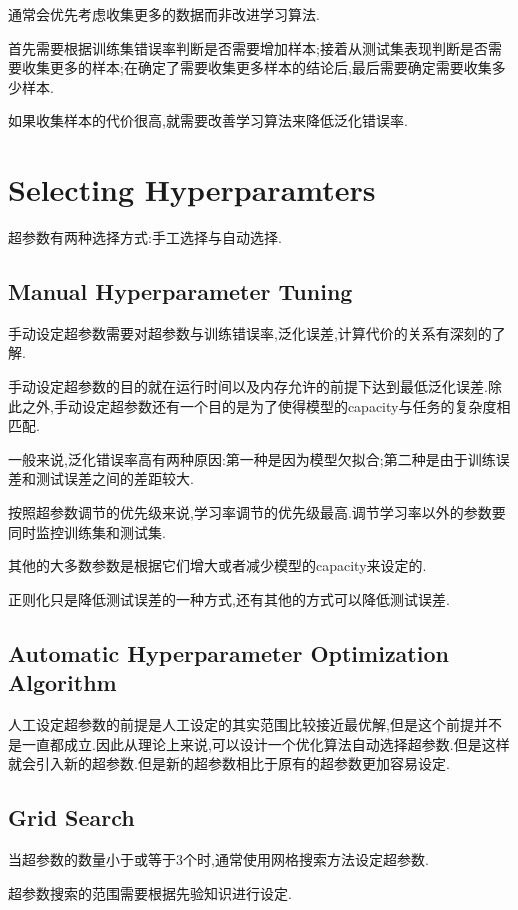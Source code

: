 通常会优先考虑收集更多的数据而非改进学习算法.

首先需要根据训练集错误率判断是否需要增加样本;接着从测试集表现判断是否需要收集更多的样本;在确定了需要收集更多样本的结论后,最后需要确定需要收集多少样本.

如果收集样本的代价很高,就需要改善学习算法来降低泛化错误率.

\section{Selecting Hyperparamters}

超参数有两种选择方式:手工选择与自动选择.

\subsection{Manual Hyperparameter Tuning}

手动设定超参数需要对超参数与训练错误率,泛化误差,计算代价的关系有深刻的了解.

手动设定超参数的目的就在运行时间以及内存允许的前提下达到最低泛化误差.除此之外,手动设定超参数还有一个目的是为了使得模型的capacity与任务的复杂度相匹配.

一般来说,泛化错误率高有两种原因:第一种是因为模型欠拟合;第二种是由于训练误差和测试误差之间的差距较大.

按照超参数调节的优先级来说,学习率调节的优先级最高.调节学习率以外的参数要同时监控训练集和测试集.

其他的大多数参数是根据它们增大或者减少模型的capacity来设定的.

正则化只是降低测试误差的一种方式,还有其他的方式可以降低测试误差.

\subsection{Automatic Hyperparameter Optimization Algorithm}

人工设定超参数的前提是人工设定的其实范围比较接近最优解,但是这个前提并不是一直都成立.因此从理论上来说,可以设计一个优化算法自动选择超参数.但是这样就会引入新的超参数.但是新的超参数相比于原有的超参数更加容易设定.

\subsection{Grid Search}

当超参数的数量小于或等于$3$个时,通常使用网格搜索方法设定超参数.

超参数搜索的范围需要根据先验知识进行设定.

